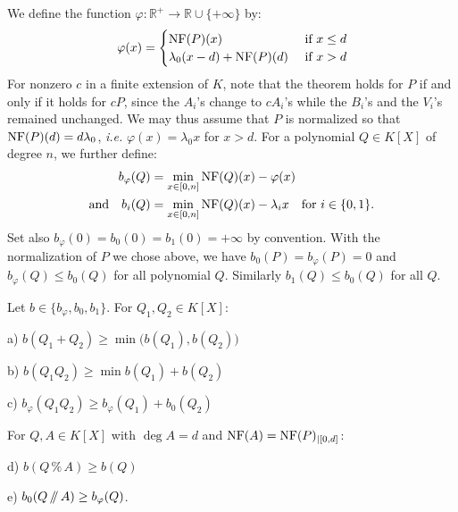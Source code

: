 \documentclass{sig-alternate-05-2015}
\newcommand{\R}{\mathbb R}
\newcommand{\NF}{\text{\rm NF}}
\renewcommand{\mod}{\,\%\,}
\renewcommand{\div}{\,/\hspace{-0.3em}/\,}
\begin{document}
We define the function $\varphi : \R^+ \to \R 
\cup \{+\infty\}$ by:
\begin{equation} \label{eqdef:functionphi}
\varphi(x) = \begin{cases} \NF(P)(x) &\mbox{ if $x \leq d$} \\
\lambda_0 (x - d) + \NF(P)(d) &\mbox{ if $x > d$} \end{cases}
\end{equation}
For nonzero $c$ in a finite extension of $K$, note that the theorem holds
for $P$ if and only if it holds for $cP$, since the $A_i$'s change to $cA_i$'s
while the $B_i$'s and the $V_i$'s remained unchanged. We may thus assume
that $P$ is normalized so that  $\NF(P)(d) = d \lambda_0$,
\emph{i.e.} $\varphi(x) = \lambda_0 x$ for $x > d$.
For a polynomial $Q \in K[X]$ of degree $n$, we further define:
\begin{align}
b_\varphi(Q) & = \min_{x \in [0,n]} \NF(Q)(x) - \varphi(x) 
\label{eqdef:bphi} \\
\text{and} \quad
b_i(Q) & = \min_{x \in [0,n]} \NF(Q)(x) - \lambda_i x
\quad \text{for } i \in \{0,1\}.
\label{eqdef:b0}
\end{align}
Set also $b_\varphi(0) = b_0(0) = b_1(0) = +\infty$ by convention.
With the normalization of $P$ we chose above, we have $b_0(P)
= b_\varphi(P) = 0$ and $b_\varphi(Q) \leq b_0(Q)$ for all polynomial
$Q$. Similarly $b_1(Q) \leq b_0(Q)$ for all $Q$.

\begin{lem}
\label{lem:bphib0}
Let $b \in \{b_\varphi, b_0, b_1\}$. For $Q_1, Q_2 \in K[X]$:

\smallskip

a) $b(Q_1+Q_2) \geq \min \big(b(Q_1), b(Q_2)\big)$

\smallskip

b) $b(Q_1Q_2) \geq \min b(Q_1) + b(Q_2)$ 

\smallskip

c) $b_\varphi(Q_1 Q_2) \geq b_\varphi(Q_1) + b_0(Q_2)$

\smallskip

\noindent
For $Q, A \in K[X]$ with $\deg A = d$ and $\NF(A) =
\NF(P)_{|[0,d]}$:

\smallskip

d) $b(Q \mod A) \geq b(Q)$

\smallskip

e) $b_0(Q \div A) \geq b_\varphi(Q)$.
\end{lem}
\end{document}

